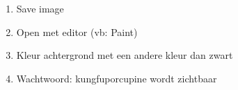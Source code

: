 \begin{enumerate}
  \item Save image
  \item Open met editor (vb: Paint)
  \item Kleur achtergrond met een andere kleur dan zwart
  \item Wachtwoord: kungfuporcupine wordt zichtbaar
\end{enumerate}